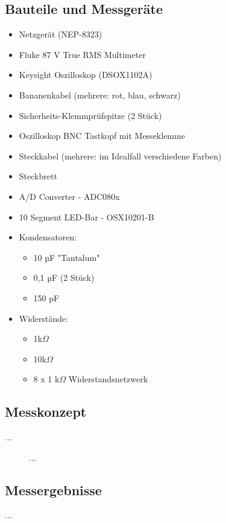 \documentclass[a4paper,12pt]{article}
\begin{document}
\subsection{Bauteile und Messgeräte}
\begin{itemize}
\item Netzgerät (NEP-8323)
\item Fluke 87 V True RMS Multimeter
\item Keysight Oszilloskop (DSOX1102A)
\item Bananenkabel (mehrere: rot, blau, schwarz)
\item Sicherheits-Klemmprüfspitze (2 Stück)
\item Oszilloskop BNC Tastkopf mit Messeklemme
\item Steckkabel (mehrere: im Idealfall verschiedene Farben)
\item Steckbrett\\
\end{itemize}


\begin{itemize}
\item A/D Converter - ADC080x
\item 10 Segment LED-Bar - OSX10201-B
\newpage
\item Kondensatoren: 
	\begin{itemize}
	\item 10 µF "Tantalum"
	\item 0,1 µF (2 Stück)
	\item 150 pF
	\end{itemize}
\item Widerstände: 
	\begin{itemize}
	\item 1k$\Omega$
	\item 10k$\Omega$
	\item 8 x 1 k$\Omega$ Widerstandsnetzwerk
	\end{itemize}
\end{itemize}

\subsection{Messkonzept}
...

\begin{figure}[H]
    \centering
\caption{...}
\end{figure}


\subsection{Messergebnisse}
...
\end{document}
